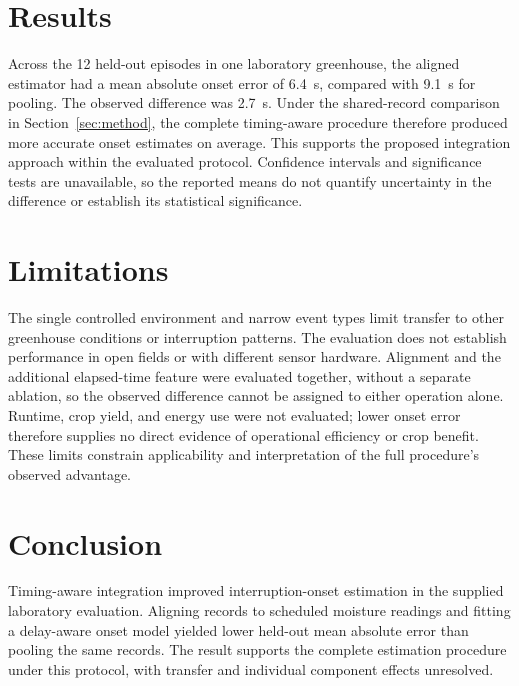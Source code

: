 \section{Results}
\label{sec:results}
Across the 12 held-out episodes in one laboratory greenhouse, the aligned estimator had a mean absolute onset error of 6.4~s, compared with 9.1~s for pooling. The observed difference was 2.7~s. Under the shared-record comparison in Section~\ref{sec:method}, the complete timing-aware procedure therefore produced more accurate onset estimates on average. This supports the proposed integration approach within the evaluated protocol. Confidence intervals and significance tests are unavailable, so the reported means do not quantify uncertainty in the difference or establish its statistical significance.

\section{Limitations}
The single controlled environment and narrow event types limit transfer to other greenhouse conditions or interruption patterns. The evaluation does not establish performance in open fields or with different sensor hardware. Alignment and the additional elapsed-time feature were evaluated together, without a separate ablation, so the observed difference cannot be assigned to either operation alone. Runtime, crop yield, and energy use were not evaluated; lower onset error therefore supplies no direct evidence of operational efficiency or crop benefit. These limits constrain applicability and interpretation of the full procedure's observed advantage.

\section{Conclusion}
Timing-aware integration improved interruption-onset estimation in the supplied laboratory evaluation. Aligning records to scheduled moisture readings and fitting a delay-aware onset model yielded lower held-out mean absolute error than pooling the same records. The result supports the complete estimation procedure under this protocol, with transfer and individual component effects unresolved.
